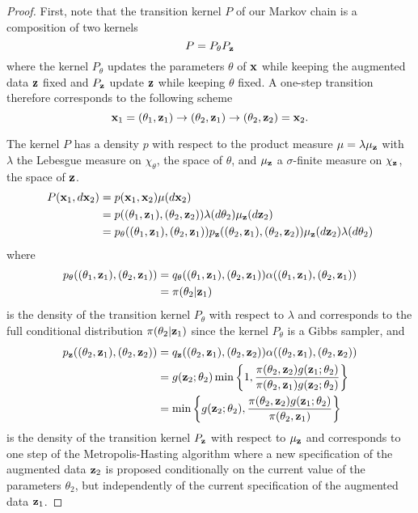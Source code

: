 \documentclass[11pt]{article}
\begin{document}
\begin{proof}
	First, note that the transition kernel $P$ of our Markov chain is a composition of two kernels
	$$ P = P_{\theta} P_{\mathbf{z}}$$
	where the kernel $ P_{\theta}$ updates the parameters $\theta$ of $\mathbf{x}$ while keeping the augmented data $\mathbf{z}$ fixed and $P_{\mathbf{z}}$ update $\mathbf{z}$ while keeping $\theta$ fixed. A one-step transition therefore corresponds to the following scheme 
	$$\mathbf{x}_1 = (\theta_1, \mathbf{z}_1) \rightarrow (\theta_2, \mathbf{z}_1) \rightarrow (\theta_2, \mathbf{z}_2) = \mathbf{x}_2.$$
		
	The kernel $P$ has a density $p$ with respect to the product measure $\mu = \lambda \mu_{\mathbf{z}}$ with $\lambda$ the Lebesgue measure on $\chi_{\theta}$, the space of $\theta$, and $\mu_{\mathbf{z}}$ a $\sigma$-finite measure on $\chi_{\mathbf{z}}$, the space of $\mathbf{z}$.
	\begin{align*}
		P(\mathbf{x}_1, d\mathbf{x}_2) 
		& = p(\mathbf{x}_1, \mathbf{x}_2) \mu(d\mathbf{x}_2) \\
		& = p((\theta_1, \mathbf{z}_1), (\theta_2, \mathbf{z}_2)) \lambda(d\theta_2)\mu_{\mathbf{z}}(d\mathbf{z}_2) \\
		& = p_{\theta}((\theta_1, \mathbf{z}_1), (\theta_2, \mathbf{z}_1)) p_{\mathbf{z}}((\theta_2, \mathbf{z}_1), (\theta_2, \mathbf{z}_2)) \mu_{\mathbf{z}}(d\mathbf{z}_2) \lambda(d\theta_2)
	\end{align*}
	where
	\begin{align*}
		p_{\theta}((\theta_1, \mathbf{z}_1), (\theta_2, \mathbf{z}_1))
		& = q_{\theta}((\theta_1, \mathbf{z}_1), (\theta_2, \mathbf{z}_1)) \alpha((\theta_1, \mathbf{z}_1), (\theta_2, \mathbf{z}_1)) \\
		& = \pi(\theta_2| \mathbf{z}_1)
	\end{align*}
	is the density of the transition kernel $P_{\theta}$ with respect to $\lambda$ and corresponds to the full conditional distribution $\pi(\theta_2| \mathbf{z}_1)$ since the kernel $P_{\theta}$ is a Gibbs sampler, and
	\begin{align*}
		p_{\mathbf{z}}((\theta_2, \mathbf{z}_1), (\theta_2, \mathbf{z}_2))
		& = q_{\mathbf{z}}((\theta_2, \mathbf{z}_1), (\theta_2, \mathbf{z}_2)) \alpha((\theta_2, \mathbf{z}_1), (\theta_2, \mathbf{z}_2)) \\
		& = g(\mathbf{z}_2; \theta_2) \min\left\lbrace 1, \dfrac{\pi(\theta_2, \mathbf{z}_2)g(\mathbf{z}_1; \theta_2)}{\pi(\theta_2, \mathbf{z}_1)g(\mathbf{z}_2; \theta_2)} \right\rbrace \\
		& = \min\left\lbrace g(\mathbf{z}_2; \theta_2), \dfrac{\pi(\theta_2, \mathbf{z}_2)g(\mathbf{z}_1; \theta_2)}{\pi(\theta_2, \mathbf{z}_1)} \right\rbrace
	\end{align*}
	is the density of the transition kernel $P_{\mathbf{z}}$ with respect to $\mu_{\mathbf{z}}$ and corresponds to one step of the Metropolis-Hasting algorithm where a new specification of the augmented data $\mathbf{z}_2$ is proposed conditionally on the current value of the parameters $\theta_2$, but independently of the current specification of the augmented data $\mathbf{z}_1$.
	

\end{proof}
\end{document}
